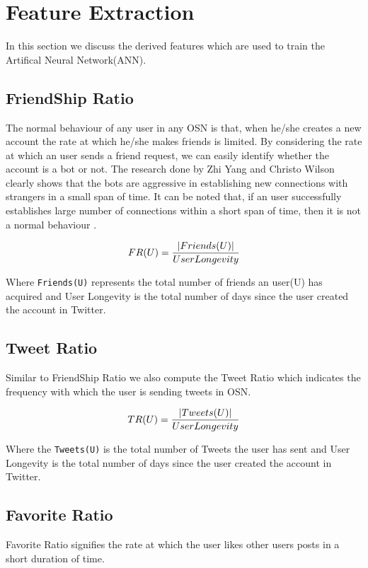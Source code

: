 \documentclass[conference]{IEEEtran}
\begin{document}
\section{Feature Extraction}
\label{featureDescription}
In this section we discuss the derived features which are used to train the Artifical Neural Network(ANN).

\subsection{FriendShip Ratio}
The normal behaviour of any user in any OSN is that, when he/she creates a new account the rate at which he/she makes friends is limited. By considering the rate at which an user sends a friend request, we can easily identify whether the account is a bot or not. The research done by Zhi Yang and Christo Wilson clearly shows that the bots are aggressive in establishing new connections with strangers in a small span of time. It can be noted that, if an user successfully establishes large number of connections within a short span of time, then it is not a normal behaviour \cite{11}.

\begin{equation}
	 FR (U) = \frac{|Friends(U)|}{User Longevity} \\
\end{equation}

Where \verb |Friends(U)| represents the total number of friends an user(U) has acquired and User Longevity is the total number of days since the user created the account in Twitter. 

\subsection{Tweet Ratio}
Similar to FriendShip Ratio we also compute the Tweet Ratio which indicates the frequency with which the user is sending tweets in OSN.
	
\begin{equation}
	 TR (U) = \frac{|Tweets(U)|}{User Longevity} \\
\end{equation}	

Where the \verb |Tweets(U)| is the total number of Tweets the user has sent and User Longevity is the total number of days since the user created the account in Twitter.

\subsection{Favorite Ratio}
Favorite Ratio signifies the rate at which the user likes other users posts in a short duration of time. 
\end{document}
